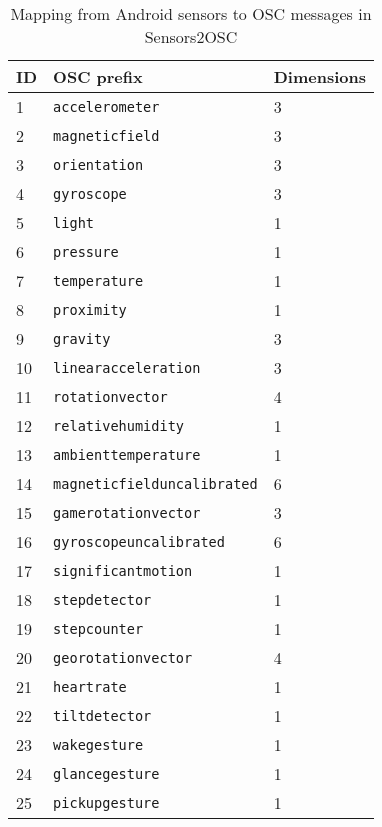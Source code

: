 \begin{table}[t]
\centering
\caption{Mapping from Android sensors to OSC messages in Sensors2OSC}
\label{tab:mapping}
\begin{tabular}{|l|l|l|}  \hline
ID & OSC prefix                  & Dimensions \\   \hline
1  & \lstinline$accelerometer$             & 3          \\
2  & \lstinline$magneticfield$             & 3          \\
3  & \lstinline$orientation$              & 3          \\
4  & \lstinline$gyroscope$                 & 3          \\
5  & \lstinline$light$                      & 1          \\
6  & \lstinline$pressure$                   & 1          \\
7  & \lstinline$temperature$                & 1          \\
8  & \lstinline$proximity$                  & 1          \\
9  & \lstinline$gravity$                   & 3          \\
10 & \lstinline$linearacceleration$        & 3          \\
11 & \lstinline$rotationvector$            & 4          \\
12 & \lstinline$relativehumidity$           & 1          \\
13 & \lstinline$ambienttemperature$         & 1          \\
14 & \lstinline$magneticfielduncalibrated$  & 6          \\
15 & \lstinline$gamerotationvector$        & 3          \\
16 & \lstinline$gyroscopeuncalibrated$     & 6          \\
17 & \lstinline$significantmotion$          & 1          \\
18 & \lstinline$stepdetector$               & 1          \\
19 & \lstinline$stepcounter$                & 1          \\
20 & \lstinline$georotationvector$         & 4          \\
21 & \lstinline$heartrate$                  & 1         \\ 
22 & \lstinline$tiltdetector$               & 1      \\
23 & \lstinline$wakegesture$             & 1      \\
24 & \lstinline$glancegesture$           & 1      \\
25 & \lstinline$pickupgesture$           & 1     \\ \hline
\end{tabular}
\end{table}

